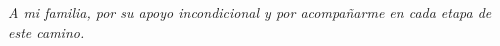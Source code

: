 \vspace*{0.4\textheight}
{\hfill{\Large{\emph{A mi familia, por su apoyo incondicional y por acompañarme en cada etapa de este camino.}}}}
